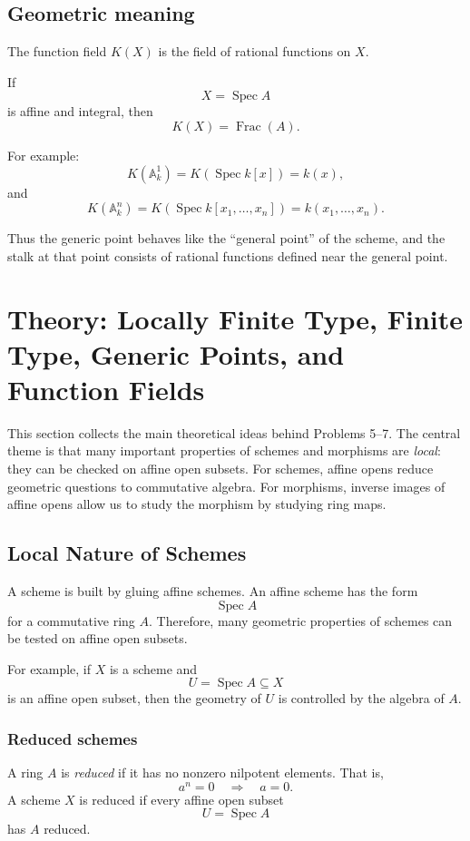 \documentclass[12pt,a4paper]{article}
\theoremstyle{notespace}
\begin{document}
\subsection*{Geometric meaning}

The function field \(K(X)\) is the field of rational functions on \(X\).

If
\[
X=\operatorname{Spec}A
\]
is affine and integral, then
\[
K(X)=\operatorname{Frac}(A).
\]

For example:
\[
K(\mathbb{A}^1_k)
=
K(\operatorname{Spec}k[x])
=
k(x),
\]
and
\[
K(\mathbb{A}^n_k)
=
K(\operatorname{Spec}k[x_1,\dots,x_n])
=
k(x_1,\dots,x_n).
\]

Thus the generic point behaves like the ``general point'' of the scheme, and the stalk at that point consists of rational functions defined near the general point.

\section{Theory: Locally Finite Type, Finite Type, Generic Points, and Function Fields}

This section collects the main theoretical ideas behind Problems 5--7. The central theme is that many important properties of schemes and morphisms are \emph{local}: they can be checked on affine open subsets. For schemes, affine opens reduce geometric questions to commutative algebra. For morphisms, inverse images of affine opens allow us to study the morphism by studying ring maps.

\subsection{Local Nature of Schemes}

A scheme is built by gluing affine schemes. An affine scheme has the form
\[
\operatorname{Spec}A
\]
for a commutative ring \(A\). Therefore, many geometric properties of schemes can be tested on affine open subsets.

For example, if \(X\) is a scheme and
\[
U=\operatorname{Spec}A\subseteq X
\]
is an affine open subset, then the geometry of \(U\) is controlled by the algebra of \(A\).

\subsubsection*{Reduced schemes}

A ring \(A\) is \emph{reduced} if it has no nonzero nilpotent elements. That is,
\[
a^n=0
\quad\Longrightarrow\quad
a=0.
\]
A scheme \(X\) is reduced if every affine open subset
\[
U=\operatorname{Spec}A
\]
has \(A\) reduced.
\end{document}
